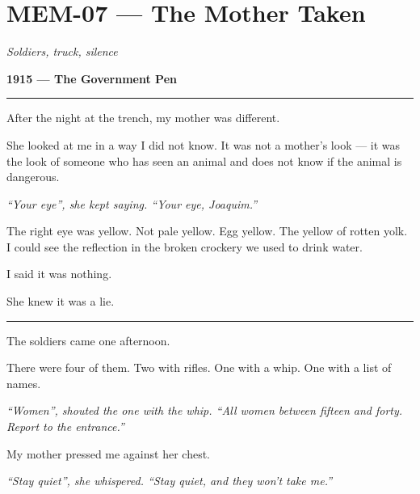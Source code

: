 \section*{\textbf{MEM-07} --- The Mother Taken}

\noindent \textit{Soldiers, truck, silence}

\noindent \textbf{1915 --- The Government Pen}

\vspace{0.5em}\noindent\rule{\textwidth}{0.5pt}\vspace{0.5em}

\noindent After the night at the trench, my mother was different.

\noindent She looked at me in a way I did not know. It was not a mother's look --- it was the look of someone who has seen an animal and does not know if the animal is dangerous.

\noindent \textit{\textquotedblleft{}Your eye\textquotedblright{}\textit{, she kept saying. }\textquotedblleft{}Your eye, Joaquim.\textquotedblright{}}

\noindent The right eye was yellow. Not pale yellow. Egg yellow. The yellow of rotten yolk. I could see the reflection in the broken crockery we used to drink water.

\noindent I said it was nothing.

\noindent She knew it was a lie.

\vspace{0.5em}\noindent\rule{\textwidth}{0.5pt}\vspace{0.5em}

\noindent The soldiers came one afternoon.

\noindent There were four of them. Two with rifles. One with a whip. One with a list of names.

\noindent \textit{\textquotedblleft{}Women\textquotedblright{}\textit{, shouted the one with the whip. }\textquotedblleft{}All women between fifteen and forty. Report to the entrance.\textquotedblright{}}

\noindent My mother pressed me against her chest.

\noindent \textit{\textquotedblleft{}Stay quiet\textquotedblright{}\textit{, she whispered. }\textquotedblleft{}Stay quiet, and they won't take me.\textquotedblright{}}

